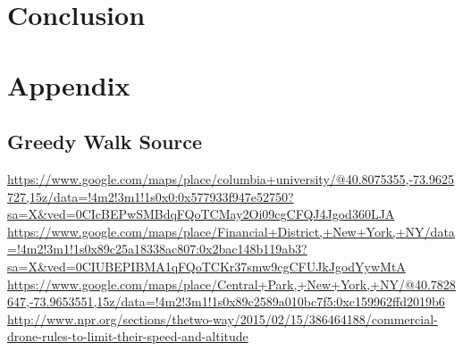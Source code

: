 \documentclass{article}
\begin{document}
\section{Conclusion}
\label{sec:conclusion}


\section{Appendix}
\label{sec:appendix}

\subsection{Greedy Walk Source}
\label{sub:greedy_walk_source}



\begin{thebibliography}{9}
    \url{https://www.google.com/maps/place/columbia+university/@40.8075355,-73.9625727,15z/data=!4m2!3m1!1s0x0:0x577933f947e52750?sa=X&ved=0CIcBEPwSMBdqFQoTCMay2Oi09cgCFQJ4Jgod360LJA}
    \url{https://www.google.com/maps/place/Financial+District,+New+York,+NY/data=!4m2!3m1!1s0x89c25a18338ac807:0x2bac148b119ab3?sa=X&ved=0CIUBEPIBMA1qFQoTCKr37smw9cgCFUJkJgodYywMtA}
    \url{https://www.google.com/maps/place/Central+Park,+New+York,+NY/@40.7828647,-73.9653551,15z/data=!4m2!3m1!1s0x89c2589a010bc7f5:0xc159962ffd2019b6}
    \url{http://www.npr.org/sections/thetwo-way/2015/02/15/386464188/commercial-drone-rules-to-limit-their-speed-and-altitude}
\end{thebibliography}
\end{document}

